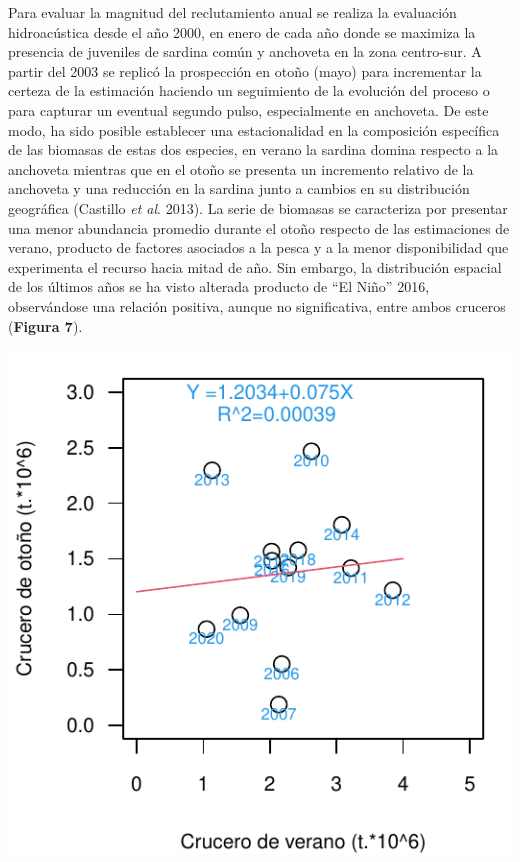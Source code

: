 \documentclass[
  spanish,
]{article}
\begin{document}
Para evaluar la magnitud del reclutamiento anual se realiza la
evaluación hidroacústica desde el año 2000, en enero de cada año donde
se maximiza la presencia de juveniles de sardina común y anchoveta en la
zona centro-sur. A partir del 2003 se replicó la prospección en otoño
(mayo) para incrementar la certeza de la estimación haciendo un
seguimiento de la evolución del proceso o para capturar un eventual
segundo pulso, especialmente en anchoveta. De este modo, ha sido posible
establecer una estacionalidad en la composición específica de las
biomasas de estas dos especies, en verano la sardina domina respecto a
la anchoveta mientras que en el otoño se presenta un incremento relativo
de la anchoveta y una reducción en la sardina junto a cambios en su
distribución geográfica (Castillo \emph{et al}. 2013). La serie de
biomasas se caracteriza por presentar una menor abundancia promedio
durante el otoño respecto de las estimaciones de verano, producto de
factores asociados a la pesca y a la menor disponibilidad que
experimenta el recurso hacia mitad de año. Sin embargo, la distribución
espacial de los últimos años se ha visto alterada producto de ``El
Niño'' 2016, observándose una relación positiva, aunque no
significativa, entre ambos cruceros (\textbf{Figura 7}).

\begin{center}\includegraphics{FigurasInforme_Marzo/Fig7_ant_reclutas-1} \end{center}
\end{document}
